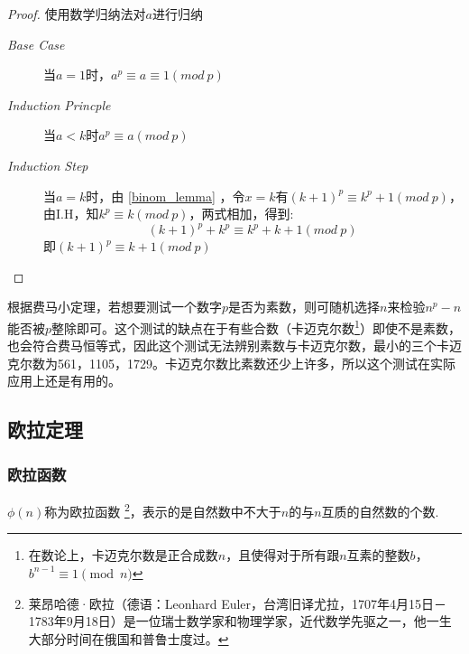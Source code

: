 \documentclass[UTF8]{ctexart}
\begin{document}
\begin{itemize}
\begin{proof}
		      使用数学归纳法对$a$进行归纳
		      \begin{description}
			      \item[\emph{Base Case}] \qquad 当$a = 1$时，$a^p \equiv a \equiv 1(mod \ p)$
			      \item[\emph{Induction Princple}] \qquad 当$a < k$时$a^p \equiv a(mod \ p)$
			      \item[\emph{Induction Step}] \qquad 当$a = k$时，由 \eqref{binom_lemma} ，令$x = k$有$(k+1)^p \equiv k^p + 1(mod \ p)$，由I.H，知$k^p \equiv k(mod \ p)$，两式相加，得到:
			            \[
				            (k+1)^p + k^p \equiv k^p + k + 1(mod \ p)
			            \]
			            即$(k+1)^p \equiv k+1(mod \ p)$
		      \end{description}
	      \end{proof}

	      根据费马小定理，若想要测试一个数字$p$是否为素数，则可随机选择$n$来检验$n^p -n$能否被$p$整除即可。这个测试的缺点在于有些合数（卡迈克尔数\footnote{在数论上，卡迈克尔数是正合成数$n$，且使得对于所有跟$n$互素的整数$b$，$b^{n-1}\equiv 1{\pmod {n}}$}）即使不是素数，也会符合费马恒等式，因此这个测试无法辨别素数与卡迈克尔数，最小的三个卡迈克尔数为561，1105，1729。卡迈克尔数比素数还少上许多，所以这个测试在实际应用上还是有用的。
\end{itemize}

\subsection{欧拉定理}
\subsubsection{欧拉函数}
$\phi(n)$称为欧拉函数 \footnote{莱昂哈德·欧拉（德语：Leonhard Euler，台湾旧译尤拉，1707年4月15日－1783年9月18日）是一位瑞士数学家和物理学家，近代数学先驱之一，他一生大部分时间在俄国和普鲁士度过。}，表示的是自然数中不大于$n$的与$n$互质的自然数的个数.
\end{document}
